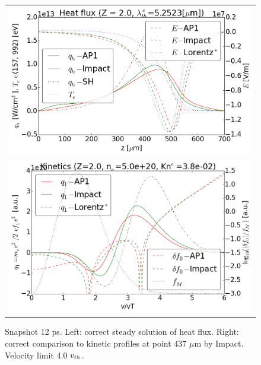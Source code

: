 \begin{figure}[tbh]
  \begin{center}
    \begin{tabular}{c}
      \includegraphics[width=\figscale\textwidth]{../VFPdata/C7_Impact_case3_heatflux.png} \\
      \includegraphics[width=\figscale\textwidth]{../VFPdata/C7_Impact_case3_kinetics.png}
    \end{tabular}
  \caption{  
  Snapshot 12 ps. Left: correct steady solution of heat flux. 
  Right: correct comparison to kinetic profiles at point 437 $\mu$m by Impact.
  Velocity limit 4.0 $v_{th}$.
  }
  \end{center}
  \label{fig:C7_Impact_case3}
\end{figure}

